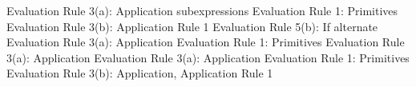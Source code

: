 \begin{schemeregion}
	 {Evaluation Rule 3(a): Application subexpressions}
	 {Evaluation Rule 1: Primitives}
	 {Evaluation Rule 3(b): Application Rule 1}
	 {Evaluation Rule 5(b): If alternate}
	 {Evaluation Rule 3(a): Application}
	 {Evaluation Rule 1: Primitives}
	 {Evaluation Rule 3(a): Application}
	 {Evaluation Rule 3(a): Application}
	 {Evaluation Rule 1: Primitives}
	 {Evaluation Rule 3(b): Application, Application Rule 1}


\end{schemeregion}
